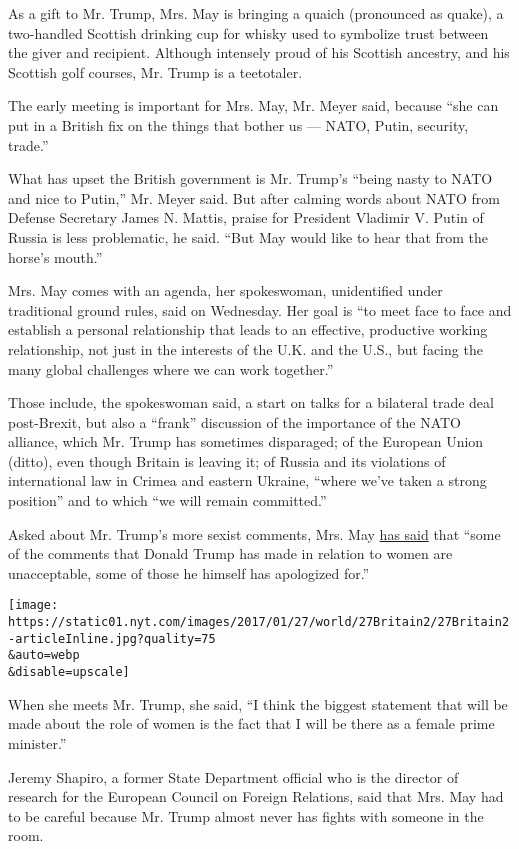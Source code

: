 As a gift to Mr. Trump, Mrs. May is bringing a quaich (pronounced as
quake), a two-handled Scottish drinking cup for whisky used to symbolize
trust between the giver and recipient. Although intensely proud of his
Scottish ancestry, and his Scottish golf courses, Mr. Trump is a
teetotaler.

The early meeting is important for Mrs. May, Mr. Meyer said, because
``she can put in a British fix on the things that bother us --- NATO,
Putin, security, trade.''

What has upset the British government is Mr. Trump's ``being nasty to
NATO and nice to Putin,'' Mr. Meyer said. But after calming words about
NATO from Defense Secretary James N. Mattis, praise for President
Vladimir V. Putin of Russia is less problematic, he said. ``But May
would like to hear that from the horse's mouth.''

Mrs. May comes with an agenda, her spokeswoman, unidentified under
traditional ground rules, said on Wednesday. Her goal is ``to meet face
to face and establish a personal relationship that leads to an
effective, productive working relationship, not just in the interests of
the U.K. and the U.S., but facing the many global challenges where we
can work together.''

Those include, the spokeswoman said, a start on talks for a bilateral
trade deal post-Brexit, but also a ``frank'' discussion of the
importance of the NATO alliance, which Mr. Trump has sometimes
disparaged; of the European Union (ditto), even though Britain is
leaving it; of Russia and its violations of international law in Crimea
and eastern Ukraine, ``where we've taken a strong position'' and to
which ``we will remain committed.''

Asked about Mr. Trump's more sexist comments, Mrs. May
\href{https://www.nytimes.com/2017/01/22/world/europe/uk-theresa-may-trident-missile.html?_r=0}{has
said} that ``some of the comments that Donald Trump has made in relation
to women are unacceptable, some of those he himself has apologized
for.''

\texttt{[image: https://static01.nyt.com/images/2017/01/27/world/27Britain2/27Britain2-articleInline.jpg?quality=75\\\&auto=webp\\\&disable=upscale]}

When she meets Mr. Trump, she said, ``I think the biggest statement that
will be made about the role of women is the fact that I will be there as
a female prime minister.''

Jeremy Shapiro, a former State Department official who is the director
of research for the European Council on Foreign Relations, said that
Mrs. May had to be careful because Mr. Trump almost never has fights
with someone in the room.


